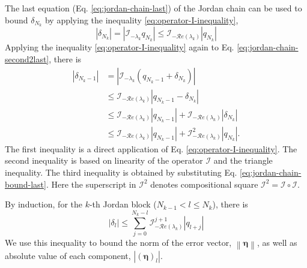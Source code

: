 \documentclass[]{uai2023}
\newcommand{\Err}{\eta}
\newcommand{\I}{\mathcal{I}}
\renewcommand{\Re}[1]{\mathcal{R}e\left(#1\right)}
\begin{document}
    The last equation (Eq. \ref{eq:jordan-chain-last}) of the Jordan chain can be used to bound $\delta_{N_k}$ by applying the inequality \ref{eq:operator-I-inequality}, 
    \begin{equation}\label{eq:jordan-chain-bound-last}
        |\delta_{N_k}| = \left|\I_{-\lambda_k}q_{N_k}\right| \leq \I_{-\Re{\lambda_k}} |q_{N_k}|
    \end{equation}
    Applying the inequality \ref{eq:operator-I-inequality} again to Eq. \ref{eq:jordan-chain-second2last}, there is
    \begin{align}
        |\delta_{N_k-1}| &= \left|\I_{-\lambda_k}\left(q_{N_k - 1} + \delta_{N_k}\right)\right| \\
        &\leq \I_{-\Re{\lambda_k}} |q_{N_k - 1} - \delta_{N_k}| \\
        &\leq \I_{-\Re{\lambda_k}} |q_{N_k - 1}| + \I_{-\Re{\lambda_k}} |\delta_{N_k}| \\
        &\leq \I_{-\Re{\lambda_k}} |q_{N_k - 1}| + \I_{-\Re{\lambda_k}}^2 |q_{N_k}|.
    \end{align}
    The first inequality is a direct application of Eq. \ref{eq:operator-I-inequality}. 
    The second inequality is based on linearity of the operator $\I$ and the triangle inequality. 
    The third inequality is obtained by substituting Eq. \ref{eq:jordan-chain-bound-last}.
    Here the superscript in $\I^2$ denotes compositional square $\I^2 = \I\circ\I$.

    By induction, for the $k$-th Jordan block ($N_{k-1} < l \leq N_k$), there is
    \begin{equation}\label{eq:system-scalar-inequality-transformed}
        |\delta_{l}|  \leq \sum_{j=0}^{N_k - l} \I_{-\Re{\lambda_k}} ^ {j+1} |q_{l+j}|
    \end{equation}
    We use this inequality to bound the norm of the error vector, $\left\|\pmb{\Err}\right\|$, as well as absolute value of each component, $\left|\left(\pmb{\Err}\right)_l\right|$. 
\end{document}
